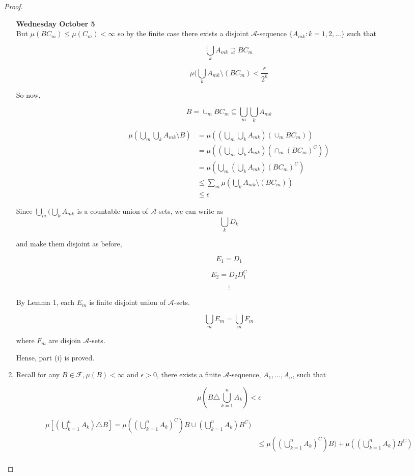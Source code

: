 \documentclass[11pt,fleqn]{book} %
\begin{document}
\begin{proof}
\begin{enumerate}
\textbf{Wednesday October 5}\\

		But $\mu(B C_m) \leq \mu(C_m) < \infty$ so by the finite case there exists a disjoint $\mathcal{A}$-sequence $\{A_{mk}: k = 1, 2, \dots \}$ such that

				$$\bigcup_k A_{mk} \supseteq BC_m $$

				$$\mu(\bigcup_k A_{mk} \setminus (B C_m) < \frac{\epsilon}{2^k} $$

		So now, 

				$$B = \cup_m B C_m \subseteq \bigcup_m \bigcup_k A_{mk} $$

				
				\begin{align*}
					\mu (\bigcup_m \bigcup_k A_{mk} \setminus B) &= \mu ((\bigcup_m \bigcup_k A_{mk}) (\cup_m B C_m)) \\
						&= \mu((\bigcup_m \bigcup_k A_{mk}) (\cap_m (B C_m)^C)) \\
						&= \mu(\bigcup_m (\bigcup_k A_{mk})(B C_m)^C)\\
						&\leq \sum_m \mu(\bigcup_k A_{mk} \setminus (B C_m))\\
						&\leq \epsilon
				\end{align*}
				
		Since $\bigcup_m (\bigcup_k A_{mk}$ is a countable union of $\mathcal{A}$-sets, we can write as
				$$\bigcup_k D_k $$

		and make them disjoint as before, 

				$$E_1 = D_1 $$

				$$ E_2 = D_2 D_1^C$$

				$$ \vdots $$


		By Lemma 1, each $E_m$ is finite disjoint union of $\mathcal{A}$-sets. 

				$$\bigcup_m E_m = \bigcup_m F_m $$

		where $F_m$ are disjoin $\mathcal{A}$-sets. 

Hense, part (i) is proved.



	\item Recall for any $B\in \mathcal{F}, \mu(B) < \infty$ and $\epsilon > 0$, there exists a finite $\mathcal{A}$-sequence,  $A_1, \dots, A_n$, such that

			$$\mu(B \triangle \bigcup^n_{k=1} A_k ) < \epsilon $$

			\begin{align*}
				\mu\left[(\bigcup^n_{k=1} A_k) \triangle B \right] = \mu((\bigcup^n_{k=1} A_k)^C) B \cup (\bigcup^n_{k=1} A_k) B^C)\\
					&\leq \mu((\bigcup^n_{k=1} A_k)^C) B) + \mu((\bigcup^n_{k=1} A_k) B^C)\\
			\end{align*}


\end{enumerate}
\end{proof}
\end{document}
